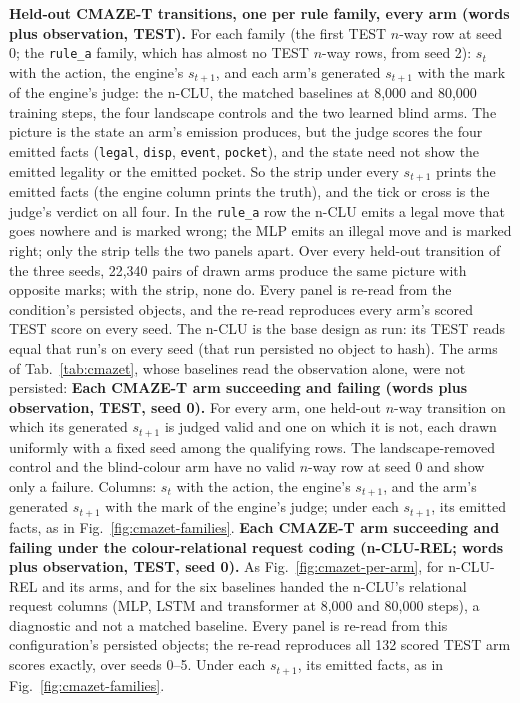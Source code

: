 \textbf{Held-out CMAZE-T transitions, one per rule family, every arm (words plus observation, TEST).} For each family (the first TEST $n$-way row at seed 0; the \texttt{rule\_a} family, which has almost no TEST $n$-way rows, from seed 2): $s_t$ with the action, the engine's $s_{t+1}$, and each arm's generated $s_{t+1}$ with the mark of the engine's judge: the n-CLU, the matched baselines at 8,000 and 80,000 training steps, the four landscape controls and the two learned blind arms. The picture is the state an arm's emission produces, but the judge scores the four emitted facts (\texttt{legal}, \texttt{disp}, \texttt{event}, \texttt{pocket}), and the state need not show the emitted legality or the emitted pocket. So the strip under every $s_{t+1}$ prints the emitted facts (the engine column prints the truth), and the tick or cross is the judge's verdict on all four. In the \texttt{rule\_a} row the n-CLU emits a legal move that goes nowhere and is marked wrong; the MLP emits an illegal move and is marked right; only the strip tells the two panels apart. Over every held-out transition of the three seeds, 22,340 pairs of drawn arms produce the same picture with opposite marks; with the strip, none do. Every panel is re-read from the condition's persisted objects, and the re-read reproduces every arm's scored TEST score on every seed. The n-CLU is the base design as run: its TEST reads equal that run's on every seed (that run persisted no object to hash). The arms of Tab.~\ref{tab:cmazet}, whose baselines read the observation alone, were not persisted: 
\textbf{Each CMAZE-T arm succeeding and failing (words plus observation, TEST, seed 0).} For every arm, one held-out $n$-way transition on which its generated $s_{t+1}$ is judged valid and one on which it is not, each drawn uniformly with a fixed seed among the qualifying rows. The landscape-removed control and the blind-colour arm have no valid $n$-way row at seed 0 and show only a failure. Columns: $s_t$ with the action, the engine's $s_{t+1}$, and the arm's generated $s_{t+1}$ with the mark of the engine's judge; under each $s_{t+1}$, its emitted facts, as in Fig.~\ref{fig:cmazet-families}.
\textbf{Each CMAZE-T arm succeeding and failing under the colour-relational request coding (n-CLU-REL; words plus observation, TEST, seed 0).} As Fig.~\ref{fig:cmazet-per-arm}, for n-CLU-REL and its arms, and for the six baselines handed the n-CLU's relational request columns (MLP, LSTM and transformer at 8,000 and 80,000 steps), a diagnostic and not a matched baseline. Every panel is re-read from this configuration's persisted objects; the re-read reproduces all 132 scored TEST arm scores exactly, over seeds 0--5. Under each $s_{t+1}$, its emitted facts, as in Fig.~\ref{fig:cmazet-families}.
